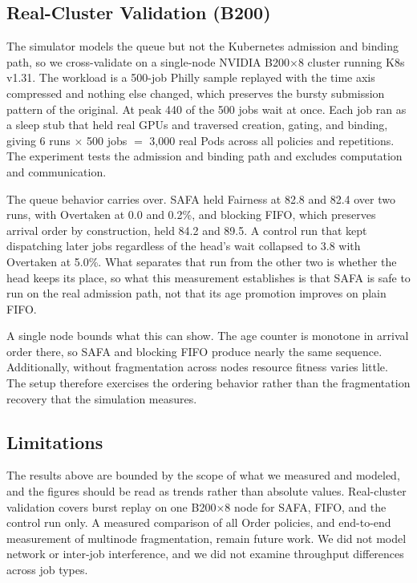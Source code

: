 \documentclass{ieeetj}
\begin{document}
\subsection{Real-Cluster Validation (B200)}\label{eval:b200}
The simulator models the queue but not the Kubernetes admission and binding path, so we cross-validate on a single-node NVIDIA B200$\times$8 cluster running K8s v1.31. The workload is a 500-job Philly sample replayed with the time axis compressed and nothing else changed, which preserves the bursty submission pattern of the original. At peak 440 of the 500 jobs wait at once. Each job ran as a sleep stub that held real GPUs and traversed creation, gating, and binding, giving 6 runs $\times$ 500 jobs $=$ 3{,}000 real Pods across all policies and repetitions. The experiment tests the admission and binding path and excludes computation and communication.

The queue behavior carries over. SAFA held Fairness at 82.8 and 82.4 over two runs, with Overtaken at 0.0 and 0.2\%, and blocking FIFO, which preserves arrival order by construction, held 84.2 and 89.5. A control run that kept dispatching later jobs regardless of the head's wait collapsed to 3.8 with Overtaken at 5.0\%. What separates that run from the other two is whether the head keeps its place, so what this measurement establishes is that SAFA is safe to run on the real admission path, not that its age promotion improves on plain FIFO.

A single node bounds what this can show. The age counter is monotone in arrival order there, so SAFA and blocking FIFO produce nearly the same sequence. Additionally, without fragmentation across nodes resource fitness varies little. The setup therefore exercises the ordering behavior rather than the fragmentation recovery that the simulation measures.

\subsection{Limitations}\label{eval:threats}
The results above are bounded by the scope of what we measured and modeled, and the figures should be read as trends rather than absolute values. Real-cluster validation covers burst replay on one B200$\times$8 node for SAFA, FIFO, and the control run only. A measured comparison of all Order policies, and end-to-end measurement of multinode fragmentation, remain future work. We did not model network or inter-job interference, and we did not examine throughput differences across job types.
\end{document}
